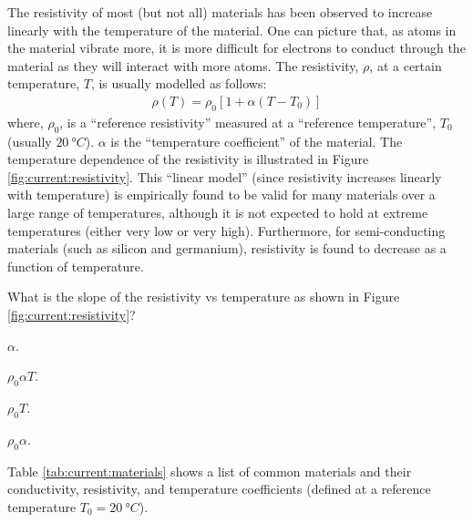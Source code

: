 The resistivity of most (but not all) materials has been observed to increase linearly with the temperature of the material. One can picture that, as atoms in the material vibrate more, it is more difficult for electrons to conduct through the material as they will interact with more atoms. The resistivity, $\rho$, at a certain temperature, $T$, is usually modelled as follows:
\begin{align*}
\rho(T)=\rho_0\left[ 1 + \alpha (T-T_0)\right]
\end{align*}
where, $\rho_0$, is a ``reference resistivity'' measured at a ``reference temperature'', $T_0$ (usually $\SI{20}{\degree C}$). $\alpha$ is the ``temperature coefficient'' of the material. The temperature dependence of the resistivity is illustrated in Figure \ref{fig:current:resistivity}.
This ``linear model'' (since resistivity increases linearly with temperature) is empirically found to be valid for many materials over a large range of temperatures, although it is not expected to hold at extreme temperatures (either very low or very high). Furthermore, for semi-conducting materials (such as silicon and germanium), resistivity is found to decrease as a function of temperature.
\begin{checkpoint}
	What is the slope of the resistivity vs temperature as shown in Figure \ref{fig:current:resistivity}?
	\begin{MCquestion}{}
		\item $\alpha$.
		\item $\rho_0 \alpha T$.
		\item $\rho_0 T$.
		\item $\rho_0 \alpha$.  \correct
	\end{MCquestion}
\end{checkpoint}
Table \ref{tab:current:materials} shows a list of common materials and their conductivity, resistivity, and temperature coefficients (defined at a reference temperature $T_0=\SI{20}{\degree C}$).
